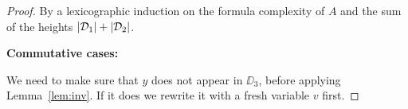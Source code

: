 	\begin{proof}
		By a lexicographic induction on the formula complexity of $A$ and the sum of the heights $|\mathcal{D}_1|+|\mathcal{D}_2|$.
		
		\textbf{Commutative cases:}\label{commutative-cases}
		
		\begin{smallequation*}
	\reducesto
\end{smallequation*}

\begin{smallequation*}\hspace*{-3.5em}
\end{smallequation*}

We need to make sure that $y$ does not appear in $\DD_3$, before applying Lemma~\ref{lem:inv}.
%
If it does we rewrite it with a fresh variable $v$ first.


\end{proof}

